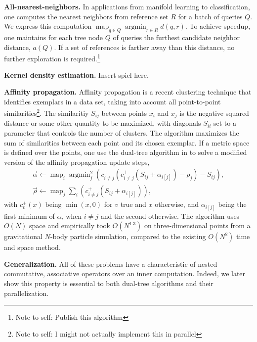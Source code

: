 \documentclass[times, leqno,twocolumn]{article}
\newcommand{\authornote}[1]{\footnote{Note to self: #1}}
\newcommand{\authorsnote}[1]{\authornote{#1}}
\DeclareMathOperator*{\map}{map}
\DeclareMathOperator*{\argmin}{argmin}
\newcommand{\ocpos}[1]{c^{+}_{#1}}
\newcommand{\cpos}[2]{\ocpos{#1 \neq #2}}
\newcommand{\simil}[2]{S_{#1#2}}
\newcommand{\vecrho}{\vec{\rho}}
\newcommand{\vecalpha}{\vec{\alpha}}
\newcommand{\frho}[1]{\rho_{#1}}
\newcommand{\falpha}[1]{\alpha_{#1}}
\newcommand{\falphaj}[2]{\alpha_{#1[#2]}}
\begin{document}
{\bf All-nearest-neighbors.}
In applications from manifold learning to classification, one computes the nearest neighbors from reference set $R$ for a batch of queries $Q$.
We express this computation $\map_{q \in Q} \argmin_{r \in R} d(q,r)$.
To achieve speedup, one maintains for each tree node $Q$ of queries the furthest candidate neighbor distance, $a(Q)$.
If a set of references is farther away than this distance, no further exploration is required.\authorsnote{Publish this algorithm}

{\bf Kernel density estimation.}
Insert spiel here.

{\bf Affinity propagation.}
Affinity propagation is a recent clustering technique that identifies exemplars in a data set, taking into account all point-to-point similarities\cite{affinity}\authorsnote{I might not actually implement this in parallel}.
The similaritiy $\simil{i}{j}$ between points $x_i$ and $x_j$ is the negative squared distance or some other quantity to be maximized, with diagonals $\simil{i}{i}$ set to a parameter that controls the number of clusters.
The algorithm maximizes the sum of similarities between each point and its chosen exemplar.
If a metric space is defined over the points, one use the dual-tree algorithm in \cite{ryan_nips} to solve a modified version of the affinity propagation update steps,
\[ \begin{array}{l}
  \vecalpha \gets \map_{i} \argmin^2_{j} \!\left( \cpos{i}{j}(\cpos{i}{j}(\simil{i}{j} + \falphaj{i}{j}) - \frho{j}) - \simil{i}{j} \right)\! ,
  \\
  \vecrho \gets \map_{j} \sum_{i} \!\left( \cpos{i}{j}(\simil{i}{j} + \falphaj{i}{j}) \right)\!,
\end{array} \]
\noindent with $\ocpos{v}(x)$ being $\min(x, 0)$ for $v$ true and $x$ otherwise, and $\falphaj{i}{j}$ being the first minimum of $\falpha{i}$ when $i \neq j$ and the second otherwise.
The algorithm uses $O(N)$ space and empirically took $O(N^{1.3})$ on three-dimensional points from a gravitational $N$-body particle simulation, compared to the existing $O(N^2)$ time and space method.

{\bf Generalization.}
All of these problems have a characteristic of nested commutative, associative operators over an inner computation.
Indeed, we later show this property is essential to both dual-tree algorithms and their parallelization.
\end{document}

